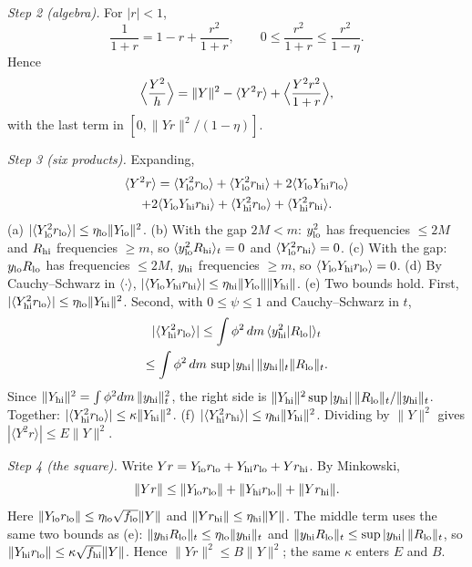 \emph{Step 2 (algebra).} For $|r|<1$,
\begin{equation}
\frac1{1+r}=1-r+\frac{r^2}{1+r},\qquad 0\le\frac{r^2}{1+r}\le\frac{r^2}{1-\eta}.
\end{equation}
Hence
\begin{equation}
\Bigl\langle\frac{Y^2}{h}\Bigr\rangle=\|Y\|^2-\langle Y^2r\rangle+\Bigl\langle\frac{Y^2r^2}{1+r}\Bigr\rangle,
\end{equation}
with the last term in $[0,\|Yr\|^2/(1-\eta)]$.

\emph{Step 3 (six products).} Expanding,
\begin{multline}
\langle Y^2r\rangle=\langle Y_{\rm lo}^2r_{\rm lo}\rangle+\langle Y_{\rm lo}^2r_{\rm hi}\rangle
+2\langle Y_{\rm lo}Y_{\rm hi}r_{\rm lo}\rangle\\
+2\langle Y_{\rm lo}Y_{\rm hi}r_{\rm hi}\rangle+\langle Y_{\rm hi}^2r_{\rm lo}\rangle+\langle Y_{\rm hi}^2r_{\rm hi}\rangle .
\end{multline}
(a) $|\langle Y_{\rm lo}^2r_{\rm lo}\rangle|\le\eta_{\rm lo}\|Y_{\rm lo}\|^2$.
(b) With the gap $2M<m$: $y_{\rm lo}^2$ has frequencies $\le2M$ and $R_{\rm hi}$ frequencies $\ge m$, so $\langle y_{\rm lo}^2R_{\rm hi}\rangle_t=0$ and $\langle Y_{\rm lo}^2r_{\rm hi}\rangle=0$.
(c) With the gap: $y_{\rm lo}R_{\rm lo}$ has frequencies $\le2M$, $y_{\rm hi}$ frequencies $\ge m$, so $\langle Y_{\rm lo}Y_{\rm hi}r_{\rm lo}\rangle=0$.
(d) By Cauchy--Schwarz in $\langle\cdot\rangle$, $|\langle Y_{\rm lo}Y_{\rm hi}r_{\rm hi}\rangle|\le\eta_{\rm hi}\|Y_{\rm lo}\|\|Y_{\rm hi}\|$.
(e) Two bounds hold.
First, $|\langle Y_{\rm hi}^2r_{\rm lo}\rangle|\le\eta_{\rm lo}\|Y_{\rm hi}\|^2$.
Second, with $0\le\psi\le1$ and Cauchy--Schwarz in $t$,
\begin{multline}
|\langle Y_{\rm hi}^2r_{\rm lo}\rangle|\le\int\phi^2\,dm\,\langle y_{\rm hi}^2|R_{\rm lo}|\rangle_t\\
\le\int\phi^2\,dm\,\sup|y_{\rm hi}|\,\|y_{\rm hi}\|_t\|R_{\rm lo}\|_t .
\end{multline}
Since $\|Y_{\rm hi}\|^2=\int\phi^2dm\,\|y_{\rm hi}\|_t^2$, the right side is $\|Y_{\rm hi}\|^2\sup|y_{\rm hi}|\,\|R_{\rm lo}\|_t/\|y_{\rm hi}\|_t$.
Together: $|\langle Y_{\rm hi}^2r_{\rm lo}\rangle|\le\kappa\|Y_{\rm hi}\|^2$.
(f) $|\langle Y_{\rm hi}^2r_{\rm hi}\rangle|\le\eta_{\rm hi}\|Y_{\rm hi}\|^2$.
Dividing by $\|Y\|^2$ gives $|\langle Y^2r\rangle|\le E\|Y\|^2$.

\emph{Step 4 (the square).} Write $Yr=Y_{\rm lo}r_{\rm lo}+Y_{\rm hi}r_{\rm lo}+Yr_{\rm hi}$.
By Minkowski,
\begin{equation}
\|Yr\|\le\|Y_{\rm lo}r_{\rm lo}\|+\|Y_{\rm hi}r_{\rm lo}\|+\|Yr_{\rm hi}\|.
\end{equation}
Here $\|Y_{\rm lo}r_{\rm lo}\|\le\eta_{\rm lo}\sqrt{f_{\rm lo}}\|Y\|$ and $\|Yr_{\rm hi}\|\le\eta_{\rm hi}\|Y\|$.
The middle term uses the same two bounds as (e): $\|y_{\rm hi}R_{\rm lo}\|_t\le\eta_{\rm lo}\|y_{\rm hi}\|_t$ and $\|y_{\rm hi}R_{\rm lo}\|_t\le\sup|y_{\rm hi}|\,\|R_{\rm lo}\|_t$, so $\|Y_{\rm hi}r_{\rm lo}\|\le\kappa\sqrt{f_{\rm hi}}\|Y\|$.
Hence $\|Yr\|^2\le B\|Y\|^2$; the same $\kappa$ enters $E$ and $B$.

